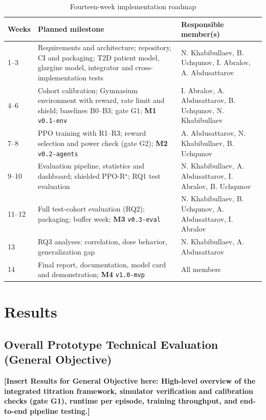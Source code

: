 \documentclass[conference]{IEEEtran}
\begin{document}
\begin{table}[t]
\centering
\caption{Fourteen-week implementation roadmap}
\label{tab:roadmap}
\scriptsize
\begin{tabular}{@{}p{1.3cm}p{10.0cm}p{5.6cm}@{}}
\toprule
\textbf{Weeks} & \textbf{Planned milestone} & \textbf{Responsible member(s)} \\
\midrule
1--3 & Requirements and architecture; repository, CI and packaging; T2D patient model, glargine model, integrator and cross-implementation tests & N. Khabibullaev, B. Uchqunov, I. Abralov, A. Abdusattarov \\
4--6 & Cohort calibration; Gymnasium environment with reward, rate limit and shield; baselines B0--B3; gate G1; \textbf{M1} \texttt{v0.1-env} & I. Abralov, A. Abdusattarov, B. Uchqunov, N. Khabibullaev \\
7--8 & PPO training with R1--R3; reward selection and power check (gate G2); \textbf{M2} \texttt{v0.2-agents} & A. Abdusattarov, N. Khabibullaev, B. Uchqunov \\
9--10 & Evaluation pipeline, statistics and dashboard; shielded PPO-R$^\star$; RQ1 test evaluation & N. Khabibullaev, A. Abdusattarov, I. Abralov, B. Uchqunov \\
11--12 & Full test-cohort evaluation (RQ2); packaging; buffer week; \textbf{M3} \texttt{v0.3-eval} & N. Khabibullaev, B. Uchqunov, A. Abdusattarov, I. Abralov \\
13 & RQ3 analyses: correlation, dose behavior, generalization gap & N. Khabibullaev, A. Abdusattarov \\
14 & Final report, documentation, model card and demonstration; \textbf{M4} \texttt{v1.0-mvp} & All members \\
\bottomrule
\end{tabular}
\end{table}

\clearpage
\section{Results}

\subsection{Overall Prototype Technical Evaluation (General Objective)}
\textbf{[Insert Results for General Objective here: High-level overview of the integrated titration framework, simulator verification and
calibration checks (gate G1), runtime per episode, training throughput, and end-to-end
pipeline testing.]}
\end{document}
